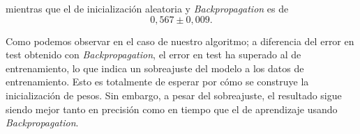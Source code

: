 mientras que el de inicialización aleatoria y \textit{Backpropagation} es de 
\begin{equation}
    0,567 \pm 0,009.
\end{equation}


Como podemos observar en el caso de nuestro 
algoritmo; a diferencia del error en test obtenido con \textit{Backpropagation}, el error en test ha superado al de entrenamiento, lo que indica un sobreajuste 
del modelo a los datos de entrenamiento. Esto es totalmente de esperar por 
cómo se construye la inicialización de pesos. Sin embargo, a pesar del sobreajuste, el resultado sigue siendo mejor tanto en precisión como en tiempo que el de aprendizaje usando \textit{Backpropagation}.  



\newpage

